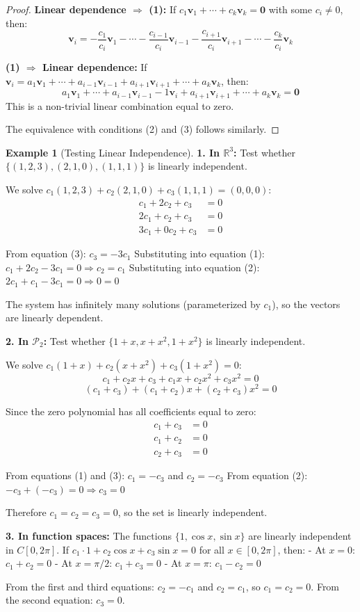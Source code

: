 \documentclass[12pt]{article}
\numberwithin{equation}{section}
\newcommand{\vect}[1]{\boldsymbol{#1}}   %
\theoremstyle{plain}
\theoremstyle{definition}
\newtheorem{example}[theorem]{Example}
\theoremstyle{remark}
\begin{document}
\begin{proof}
\textbf{Linear dependence $\Rightarrow$ (1):} If $c_1\vect{v}_1 + \cdots + c_k\vect{v}_k = \vect{0}$ with some $c_i \neq 0$, then:
$$\vect{v}_i = -\frac{c_1}{c_i}\vect{v}_1 - \cdots - \frac{c_{i-1}}{c_i}\vect{v}_{i-1} - \frac{c_{i+1}}{c_i}\vect{v}_{i+1} - \cdots - \frac{c_k}{c_i}\vect{v}_k$$

\textbf{(1) $\Rightarrow$ Linear dependence:} If $\vect{v}_i = a_1\vect{v}_1 + \cdots + a_{i-1}\vect{v}_{i-1} + a_{i+1}\vect{v}_{i+1} + \cdots + a_k\vect{v}_k$, then:
$$a_1\vect{v}_1 + \cdots + a_{i-1}\vect{v}_{i-1} - 1\vect{v}_i + a_{i+1}\vect{v}_{i+1} + \cdots + a_k\vect{v}_k = \vect{0}$$
This is a non-trivial linear combination equal to zero.

The equivalence with conditions (2) and (3) follows similarly.
\end{proof}

\begin{example}[Testing Linear Independence]
\textbf{1. In $\mathbb{R}^3$:}
Test whether $\{(1,2,3), (2,1,0), (1,1,1)\}$ is linearly independent.

We solve $c_1(1,2,3) + c_2(2,1,0) + c_3(1,1,1) = (0,0,0)$:
\begin{align}
c_1 + 2c_2 + c_3 &= 0\\
2c_1 + c_2 + c_3 &= 0\\
3c_1 + 0c_2 + c_3 &= 0
\end{align}

From equation (3): $c_3 = -3c_1$
Substituting into equation (1): $c_1 + 2c_2 - 3c_1 = 0 \Rightarrow c_2 = c_1$
Substituting into equation (2): $2c_1 + c_1 - 3c_1 = 0 \Rightarrow 0 = 0$ \checkmark

The system has infinitely many solutions (parameterized by $c_1$), so the vectors are linearly dependent.

\textbf{2. In $\mathcal{P}_2$:}
Test whether $\{1 + x, x + x^2, 1 + x^2\}$ is linearly independent.

We solve $c_1(1 + x) + c_2(x + x^2) + c_3(1 + x^2) = 0$:
$$c_1 + c_2x + c_3 + c_1x + c_2x^2 + c_3x^2 = 0$$
$$(c_1 + c_3) + (c_1 + c_2)x + (c_2 + c_3)x^2 = 0$$

Since the zero polynomial has all coefficients equal to zero:
\begin{align}
c_1 + c_3 &= 0\\
c_1 + c_2 &= 0\\
c_2 + c_3 &= 0
\end{align}

From equations (1) and (3): $c_1 = -c_3$ and $c_2 = -c_3$
From equation (2): $-c_3 + (-c_3) = 0 \Rightarrow c_3 = 0$

Therefore $c_1 = c_2 = c_3 = 0$, so the set is linearly independent.

\textbf{3. In function spaces:}
The functions $\{1, \cos x, \sin x\}$ are linearly independent in $C[0, 2\pi]$. If $c_1 \cdot 1 + c_2\cos x + c_3\sin x = 0$ for all $x \in [0, 2\pi]$, then:
- At $x = 0$: $c_1 + c_2 = 0$
- At $x = \pi/2$: $c_1 + c_3 = 0$  
- At $x = \pi$: $c_1 - c_2 = 0$

From the first and third equations: $c_2 = -c_1$ and $c_2 = c_1$, so $c_1 = c_2 = 0$.
From the second equation: $c_3 = 0$.
\end{example}
\end{document}
